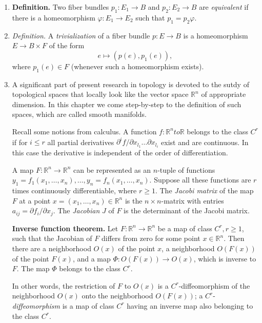\documentclass{article}
\newcommand{\Rn}{\mathbb{R}^n}
\begin{document}
\begin{enumerate}
\item \textbf{Definition.} Two fiber bundles $p_1 : E_1 \to B$ and
  $p_2 : E_2 \to B$ are \textit{equivalent} if there is a
  homeomorphism $\varphi : E_1 \to E_2$ such that $p_1 = p_2\varphi$.

\item \textit{Definition.} A \textit{trivialization} of a fiber bundle
  $p : E \to B$ is a homeomorphism $E \to B \times F$ of the form
\[
e \mapsto (p(e),p_1(e)),
\]
where $p_1(e) \in F$ (whenever such a homeomorphism exists).

\item A significant part of present research in topology is devoted to
  the sutdy of topological spaces that locally look like the vector
  space $\Rn$ of appropriate dimension. In this chapter we
  come step-by-step to the definition of such spaces, which are called
  smooth manifolds.

Recall some notions from calculus. A function $f : \Rn to
\mathbb{R}$ belongs to the class $C^r$ if for $i \leq r$ all partial
derivatives $\partial^if/\partial x_{l_1}\dots\partial x_{l_i}$ exist
and are continuous. In this case the derivative is independent of the
order of differentiation.

A map $F : \Rn \to \Rn$ can be represented as an
$n$-tuple of functions $y_1 = f_1(x_1,\dots,x_n),\dots,y_n =
f_n(x_1,\dots,x_n)$. Suppose all these functions are $r$ times
continuously differentiable, where $r \geq 1$. The \textit{Jacobi
  matrix} of the map $F$ at a point $x = (x_1,\dots,x_n) \in
\Rn$ is the $n \times n$-matrix with entries $a_{ij}
= \partial f_i/\partial x_j$. The \textit{Jacobian} $J$ of $F$ is the
determinant of the Jacobi matrix.

\textbf{Inverse function theorem.} Let $F : \Rn \to \Rn$ be a map of
class $C^r, r \geq 1$, such that the Jacobian of $F$ differs from zero
for some point $x \in \Rn$. Then there are a neighborhood $O(x)$ of
the point $x$, a neighborhood $O(F(x))$ of the point $F(x)$, and a map
$\Phi : O(F(x)) \to O(x)$, which is inverse to $F$. The map $\Phi$
belongs to the class $C^r$.

In other words, the restriction of $F$ to $O(x)$ is a
$C^r$-diffeomorphism of the neighborhood $O(x)$ onto the neighborhood
$O(F(x))$; a $C^r$-\textit{diffeomorphism} is a map of class $C^r$
having an inverse map also belonging to the class $C^r$.
\end{enumerate}
\end{document}
